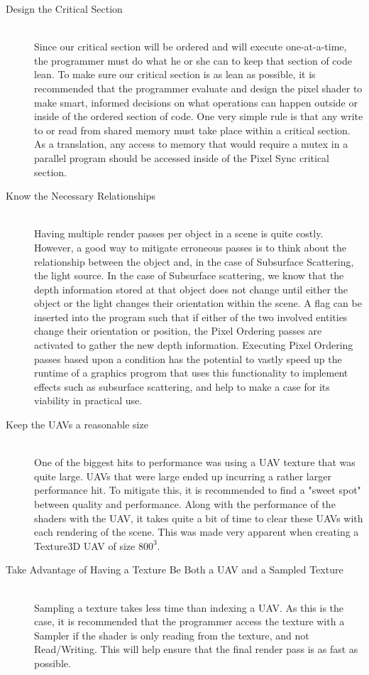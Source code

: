 \documentclass[a4paper, 12pt]{article}
\begin{document}
\begin{description}

\item[Design the Critical Section] \hfill \\

Since our critical section will be ordered and will execute one-at-a-time, the
programmer must do what he or she can to keep that section of code lean. To
make sure our critical section is as lean as possible, it is recommended that
the programmer evaluate and design the pixel shader to make smart, informed
decisions on what operations can happen outside or inside of the ordered
section of code. One very simple rule is that any write to or read from shared
memory must take place within a critical section. As a translation, any access
to memory that would require a mutex in a parallel program should be accessed
inside of the Pixel Sync critical section.

\item[Know the Necessary Relationships] \hfill \\

Having multiple render passes per object in a scene is quite costly. However,
a good way to mitigate erroneous passes is to think about the relationship
between the object and, in the case of Subsurface Scattering, the light
source. In the case of Subsurface scattering, we know that the depth
information stored at that object does not change until either the object or
the light changes their orientation within the scene. A flag can be inserted
into the program such that if either of the two involved entities change their
orientation or position, the Pixel Ordering passes are activated to gather the
new depth information. Executing Pixel Ordering passes based upon a condition
has the potential to vastly speed up the runtime of a graphics progrom that
uses this functionality to implement effects such as subsurface scattering,
and help to make a case for its viability in practical use.

\item[Keep the UAVs a reasonable size] \hfill \\

One of the biggest hits to performance was using a UAV texture that was quite
large. UAVs that were large ended up incurring a rather larger performance
hit. To mitigate this, it is recommended to find a "sweet spot" between
quality and performance. Along with the performance of the shaders with the
UAV, it takes quite a bit of time to clear these UAVs with each rendering of
the scene. This was made very apparent when creating a Texture3D UAV of size
$800^3$.

\item[Take Advantage of Having a Texture Be Both a UAV and a Sampled Texture] \hfill \\

Sampling a texture takes less time than indexing a UAV. As this is the case,
it is recommended that the programmer access the texture with a Sampler if the
shader is only reading from the texture, and not Read/Writing. This will help
ensure that the final render pass is as fast as possible.

\end{description}
\end{document}
